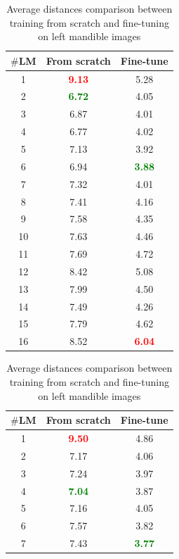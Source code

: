 \documentclass[review]{elsarticle}
\begin{document}
\begin{table}
	\begin{minipage}[t]{0.45\textwidth}
		\centering
		\begin{tabular}{|c|c|c|}
			\hline
			\textbf{$\#$LM} & \textbf{From scratch} & \textbf{Fine-tune} \\ \hline
			1 & \textcolor{red}{\textbf{9.13}} & 5.28 \\ \hline
			2 & \textcolor{green}{\textbf{6.72}} & 4.05 \\ \hline
			3 & 6.87 & 4.01 \\ \hline
			4 & 6.77 & 4.02 \\ \hline
			5 & 7.13 & 3.92 \\ \hline
			6 & 6.94 & \textcolor{green}{\textbf{3.88}} \\ \hline
			7 & 7.32 & 4.01 \\ \hline
			8 & 7.41 & 4.16 \\ \hline
			9 & 7.58 & 4.35 \\ \hline
			10 & 7.63 & 4.46 \\ \hline
			11 & 7.69 & 4.72 \\ \hline
			12 & 8.42 & 5.08 \\ \hline
			13 & 7.99 & 4.50 \\ \hline
			14 & 7.49 & 4.26 \\ \hline
			15 & 7.79 & 4.62 \\ \hline
			16 & 8.52 & \textcolor{red}{\textbf{6.04}} \\ \hline
		\end{tabular}
		\caption{Average distances comparison between training from scratch and fine-tuning on left mandible images}
		\label{cmpmg}
	\end{minipage}
	\hfill
	\begin{minipage}[t]{0.45\textwidth}
		\centering
		\begin{tabular}{|c|c|c|}
\hline
\textbf{$\#$LM} & \textbf{From scratch} & \textbf{Fine-tune} \\ \hline
		1 & \textcolor{red}{\textbf{9.50}} & 4.86 \\ \hline
	2 & 7.17 & 4.06\\ \hline
	3 & 7.24 & 3.97\\ \hline
	4 & \textcolor{green}{\textbf{7.04}} & 3.87 \\ \hline
	5 & 7.16 & 4.05  \\ \hline
	6 & 7.57 & 3.82  \\ \hline
	7 & 7.43 & \textcolor{green}{\textbf{3.77}}  \\ \hline

\end{tabular}
\end{minipage}
\end{table}
\end{document}
